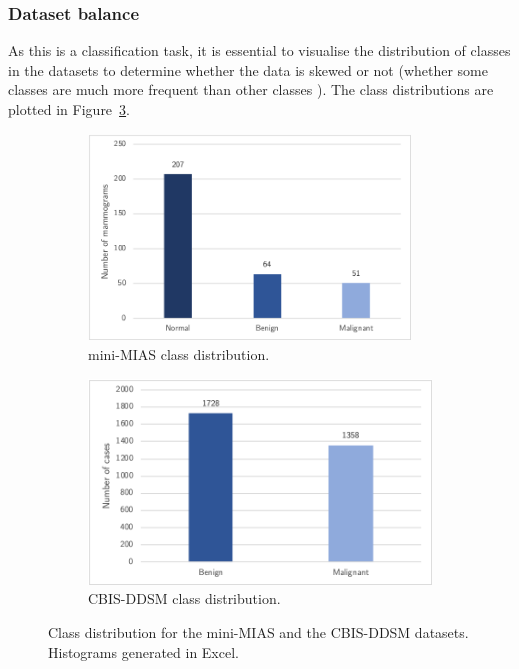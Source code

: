 \subsubsection{Dataset balance}

As this is a classification task, it is essential to visualise the distribution of classes in the datasets to determine whether the data is skewed or not (whether some classes are much more frequent than other classes \citep{Geron2019}).  The class distributions are plotted in Figure~\ref{fig:design-datasets-balance}.

\begin{figure}[h]
\centering
\begin{subfigure}{.5\textwidth}
  \centering
  \includegraphics[width=0.94\textwidth]{Dissertation/figures/design/mini-mias-balance.png}
  \caption{mini-MIAS class distribution.}
  \label{fig:design-mini-mias-balance}
\end{subfigure}%
\begin{subfigure}{.5\textwidth}
  \centering
  \includegraphics[width=\textwidth]{Dissertation/figures/design/cbis-ddsm-balance.png}
  \caption{CBIS-DDSM class distribution.}
  \label{fig:cbis-ddsm-balance}
\end{subfigure}
\caption{\label{fig:design-datasets-balance}Class distribution for the mini-MIAS and the CBIS-DDSM datasets. Histograms generated in Excel.}
\end{figure}


